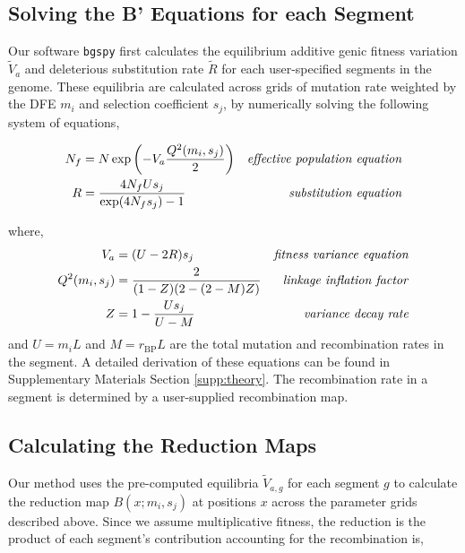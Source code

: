 \documentclass[11pt]{article}
\begin{document}
\subsection*{Solving the B' Equations for each Segment}
\label{sec:methods-bprime-eqns}

Our software \texttt{bgspy} first calculates the equilibrium additive genic
fitness variation $\widetilde{V}_a$ and deleterious substitution rate $\widetilde{R}$ for each
user-specified segments in the genome. These equilibria are calculated across
grids of mutation rate weighted by the DFE $m_i$ and selection coefficient
$s_j$, by numerically solving the following system of equations,

\begin{align}
  \label{eq:method-2eqns}
  {N}_f &= N \exp \left( -V_a \frac{Q^2(m_i, s_j)}{2} \right) & \text{\emph{effective population equation}} \\
  R &= \frac{4N_fU s_j}{\exp(4 N_f s_j)-1}  & \text{\emph{substitution equation}} 
\end{align}

where,
%
\begin{align}
  V_a &= (U - 2 R) s_j & \text{\emph{fitness variance equation}} \\
  Q^2(m_i, s_j) &= \frac{2}{(1-Z)(2-(2-M)Z)} & \text{\emph{linkage inflation factor}} \\
  Z &= 1 - \frac{Us_j}{U-{M}} & \text{\emph{variance decay rate}}
\end{align}
%
and $U = m_i L$ and $M = r_\text{BP} L$ are the total mutation and
recombination rates in the segment. A detailed derivation of these equations
can be found in Supplementary Materials Section \ref{supp:theory}. The recombination
rate in a segment is determined by a user-supplied recombination map.

\subsection*{Calculating the Reduction Maps}
\label{sec:methods-maps}

Our method uses the pre-computed equilibria $\widetilde{V}_{a,g}$ for each
segment $g$ to calculate the reduction map $B(x; m_i, s_j)$ at positions $x$
across the parameter grids described above. Since we assume multiplicative
fitness, the reduction is the product of each segment's contribution accounting
for the recombination is,
\end{document}
